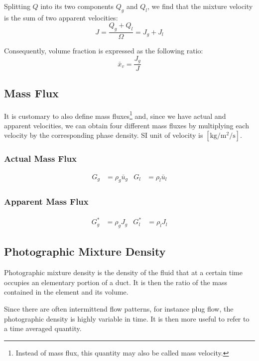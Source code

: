 Splitting $Q$ into its two components $Q_g$ and $Q_l$, we find that the mixture
velocity is the sum of two apparent velocities:
\begin{equation*}
    J = \frac{Q_g+Q_l}{\Omega} = J_g + J_l
\end{equation*}

Consequently, volume fraction is expressed as the following ratio:
\begin{equation*}
    \bar{x}_v = \frac{J_g}{J}
\end{equation*}

\subsection{Mass Flux}
It is customary to also define mass fluxes\footnote{Instead of mass flux, this
quantity may also be called mass velocity.} and, since we have actual and
apparent velocities, we can obtain four different mass fluxes by multiplying
each velocity by the corresponding phase density. SI unit of velocity is
$[\si{\kg\per\square\metre\per\second}]$.

\subsubsection{Actual Mass Flux}
\begin{align*}
    G_g &= \rho_g \bar{u}_g & G_l &= \rho_l \bar{u}_l
\end{align*}

\subsubsection{Apparent Mass Flux}
\begin{align*}
    G^*_g &= \rho_g J_g & G^*_l &= \rho_l J_l
\end{align*}

\subsection{Photographic Mixture Density}
Photographic mixture density is the density of the fluid that at a certain time
occupies an elementary portion of a duct. It is then the ratio of the mass
contained in the element and its volume.

Since there are often intermittend flow patterns, for instance plug flow, the
photographic density is highly variable in time. It is then more useful to refer
to a time averaged quantity.

